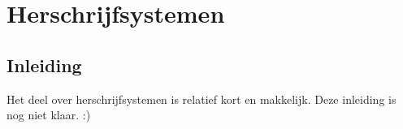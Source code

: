 \documentclass[10pt,a4paper]{article}
\begin{document}








\newpage
\section{Herschrijfsystemen}

\subsection{Inleiding}

Het deel over herschrijfsystemen is relatief kort en makkelijk. Deze inleiding is nog niet klaar. :)



\end{document}
